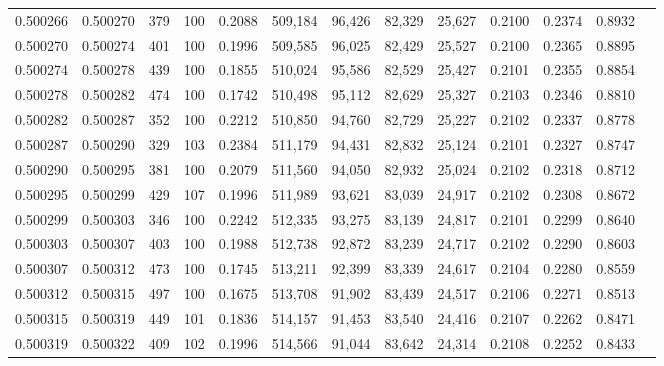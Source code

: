 \begin{tabular}{rrrrrrrrrrrrr}
0.500266 & 0.500270 &   379 & 100 &                                     0.2088 & 509,184 &  96,426 &  82,329 &  25,627 & 0.2100 & 0.2374 & 0.8932 \\
0.500270 & 0.500274 &   401 & 100 &                                     0.1996 & 509,585 &  96,025 &  82,429 &  25,527 & 0.2100 & 0.2365 & 0.8895 \\
0.500274 & 0.500278 &   439 & 100 &                                     0.1855 & 510,024 &  95,586 &  82,529 &  25,427 & 0.2101 & 0.2355 & 0.8854 \\
0.500278 & 0.500282 &   474 & 100 &                                     0.1742 & 510,498 &  95,112 &  82,629 &  25,327 & 0.2103 & 0.2346 & 0.8810 \\
0.500282 & 0.500287 &   352 & 100 &                                     0.2212 & 510,850 &  94,760 &  82,729 &  25,227 & 0.2102 & 0.2337 & 0.8778 \\
0.500287 & 0.500290 &   329 & 103 &                                     0.2384 & 511,179 &  94,431 &  82,832 &  25,124 & 0.2101 & 0.2327 & 0.8747 \\
0.500290 & 0.500295 &   381 & 100 &                                     0.2079 & 511,560 &  94,050 &  82,932 &  25,024 & 0.2102 & 0.2318 & 0.8712 \\
0.500295 & 0.500299 &   429 & 107 &                                     0.1996 & 511,989 &  93,621 &  83,039 &  24,917 & 0.2102 & 0.2308 & 0.8672 \\
0.500299 & 0.500303 &   346 & 100 &                                     0.2242 & 512,335 &  93,275 &  83,139 &  24,817 & 0.2101 & 0.2299 & 0.8640 \\
0.500303 & 0.500307 &   403 & 100 &                                     0.1988 & 512,738 &  92,872 &  83,239 &  24,717 & 0.2102 & 0.2290 & 0.8603 \\
0.500307 & 0.500312 &   473 & 100 &                                     0.1745 & 513,211 &  92,399 &  83,339 &  24,617 & 0.2104 & 0.2280 & 0.8559 \\
0.500312 & 0.500315 &   497 & 100 &                                     0.1675 & 513,708 &  91,902 &  83,439 &  24,517 & 0.2106 & 0.2271 & 0.8513 \\
0.500315 & 0.500319 &   449 & 101 &                                     0.1836 & 514,157 &  91,453 &  83,540 &  24,416 & 0.2107 & 0.2262 & 0.8471 \\
0.500319 & 0.500322 &   409 & 102 &                                     0.1996 & 514,566 &  91,044 &  83,642 &  24,314 & 0.2108 & 0.2252 & 0.8433 \\

\end{tabular}
